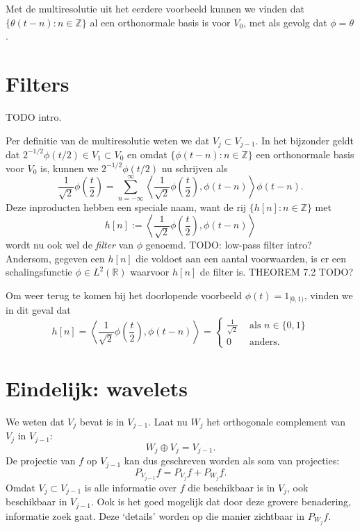 \documentclass[11pt]{amsart}
\newcommand{\R}{\mathbb{R}}
\newcommand{\Z}{\mathbb{Z}}
\begin{document}
Met de multiresolutie uit het eerdere voorbeeld kunnen we vinden dat $\{\theta(t-n): n \in \Z \}$ al een orthonormale basis is voor $V_0$, met als gevolg dat $\phi = \theta$.

\section{Filters}
TODO intro.

Per definitie van de multiresolutie weten we dat $V_j \subset V_{j-1}$. In het bijzonder geldt dat $2^{-1/2}\phi(t/2) \in V_1 \subset V_0$ en omdat $\{ \phi(t-n): n \in \Z\}$ een orthonormale basis voor $V_0$ is, kunnen we $2^{-1/2} \phi(t/2)$ nu schrijven als
\[
  \frac{1}{\sqrt{2}} \phi\left(\frac{t}{2}\right) = \sum_{n=-\infty}^{\infty} \left\langle \frac{1}{\sqrt{2}} \phi\left(\frac{t}{2}\right), \phi(t-n) \right\rangle \phi(t-n).
\]
Deze inproducten hebben een speciale naam, want de rij $\{h[n]: n \in \Z\}$ met
\[
  h[n] := \left\langle \frac{1}{\sqrt{2}} \phi\left(\frac{t}{2}\right), \phi(t-n) \right\rangle
\]
wordt nu ook wel de \emph{filter} van $\phi$ genoemd. TODO: low-pass filter intro? Andersom, gegeven een $h[n]$ die voldoet aan een aantal voorwaarden, is er een schalingsfunctie $\phi \in L^2(\R)$ waarvoor $h[n]$ de filter is. THEOREM 7.2 TODO?

Om weer terug te komen bij het doorlopende voorbeeld $\phi(t) = 1_{[0,1)}$, vinden we in dit geval dat
\[
  h[n] = \left\langle \frac{1}{\sqrt{2}} \phi\left(\frac{t}{2}\right), \phi(t-n) \right\rangle = \begin{cases} \frac{1}{\sqrt{2}} & \text{ als } n \in \{0,1\} \\ 0 & \text{ anders.} \end{cases}
\]

\section{Eindelijk: wavelets}
We weten dat $V_j$ bevat is in $V_{j-1}$. Laat nu $W_j$ het orthogonale complement van $V_j$ in $V_{j-1}$:
\[
	W_j \oplus V_j = V_{j-1}.
\]
De projectie van $f$ op $V_{j-1}$ kan dus geschreven worden als som van projecties:
\[
	P_{V_{j-1}} f = P_{V_j} f + P_{W_j} f.
\]
Omdat $V_j \subset V_{j-1}$ is alle informatie over $f$ die beschikbaar is in $V_j$, ook beschikbaar in $V_{j-1}$. Ook is het goed mogelijk dat door deze grovere benadering, informatie zoek gaat. Deze `details' worden op die manier zichtbaar in $P_{W_j} f$.
\end{document}
